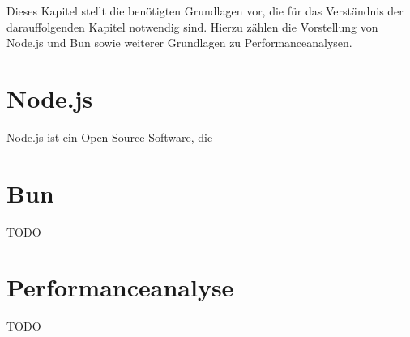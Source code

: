  \label{Grundlagen}
Dieses Kapitel stellt die benötigten Grundlagen vor, die für das Verständnis der darauffolgenden Kapitel notwendig sind. Hierzu zählen die Vorstellung von Node.js und Bun sowie weiterer Grundlagen zu Performanceanalysen.

\section{Node.js} \label{sec:Node.js}
Node.js ist ein Open Source Software, die\\

\section{Bun} \label{sec:Node}
TODO\\

\section{Performanceanalyse} \label{sec:Performanceanalyse}
TODO\\
